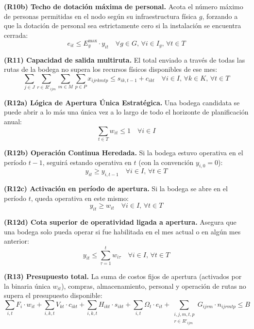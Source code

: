 \documentclass[letterpaper]{article}
\begin{document}
\begin{flushleft}
\textbf{(R10b) Techo de dotación máxima de personal.} Acota el número máximo de personas permitidas en el nodo según su infraestructura física $g$, forzando a que la dotación de personal sea estrictamente cero si la instalación se encuentra cerrada:
\begin{equation}
e_{it} \leq E^{\max}_g \cdot y_{it} \quad \forall g \in G,\, \forall i \in I_g,\, \forall t \in T
\end{equation}

\textbf{(R11) Capacidad de salida multiruta.} El total enviado a través de todas las rutas de la bodega no supera los recursos físicos disponibles de ese mes:
\begin{equation}
\sum_{j \in J} \sum_{r \in R'_{ijm}} \sum_{m \in M} \sum_{p \in P} x_{ijrkmtp} \leq s_{ik,t-1} + c_{ikt}
\quad \forall i \in I,\, \forall k \in K,\, \forall t \in T
\end{equation}

\textbf{(R12a) Lógica de Apertura Única Estratégica.} Una bodega candidata se puede abrir a lo más una única vez a lo largo de todo el horizonte de planificación anual:
\begin{equation}
\sum_{t \in T} w_{it} \leq 1 \quad \forall i \in I
\end{equation}

\textbf{(R12b) Operación Continua Heredada.} Si la bodega estuvo operativa en el período $t-1$, seguirá estando operativa en $t$ (con la convención $y_{i,0} = 0$):
\begin{equation}
y_{it} \geq y_{i,t-1} \quad \forall i \in I,\, \forall t \in T
\end{equation}

\textbf{(R12c) Activación en período de apertura.} Si la bodega se abre en el período $t$, queda operativa en este mismo:
\begin{equation}
y_{it} \geq w_{it} \quad \forall i \in I,\, \forall t \in T
\end{equation}

\textbf{(R12d) Cota superior de operatividad ligada a apertura.} Asegura que una bodega solo pueda operar si fue habilitada en el mes actual o en algún mes anterior:
\begin{equation}
y_{it} \leq \sum_{\tau=1}^{t} w_{i\tau} \quad \forall i \in I,\, \forall t \in T
\end{equation}

\textbf{(R13) Presupuesto total.} La suma de costos fijos de apertura (activados por la binaria única $w_{it}$), compras, almacenamiento, personal y operación de rutas no supera el presupuesto disponible:
\begin{equation}
\sum_{i,t} F_i \cdot w_{it} + \sum_{i,k,t} V_{kt} \cdot c_{ikt} + \sum_{i,k,t} H_{ikt} \cdot s_{ikt} + \sum_{i,t} \Omega_t \cdot e_{it} + \sum_{\substack{i,j,m,t,p \\ r \in R'_{ijm}}} G_{ijrm} \cdot n_{ijrmtp} \leq B
\end{equation}


\end{flushleft}
\end{document}
